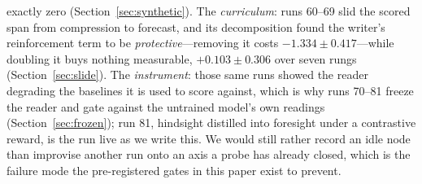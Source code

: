 \documentclass{article} %
\begin{document}
exactly zero (Section~\ref{sec:synthetic}). The \emph{curriculum}: runs 60--69 slid the scored span from
compression to forecast, and its decomposition found the writer's reinforcement term to be
\emph{protective}---removing it costs $-1.334 \pm 0.417$---while doubling it buys nothing measurable,
$+0.103 \pm 0.306$ over seven rungs (Section~\ref{sec:slide}). The \emph{instrument}: those same runs
showed the reader degrading the baselines it is used to score against, which is why runs 70--81 freeze the reader and gate against the untrained model's own readings (Section~\ref{sec:frozen}); run 81, hindsight distilled into foresight under a contrastive reward, is the run live as we write this. We
would still rather record an idle node than improvise another run onto an axis a probe has already
closed, which is the failure mode the pre-registered gates in this paper exist to prevent.
\end{document}

